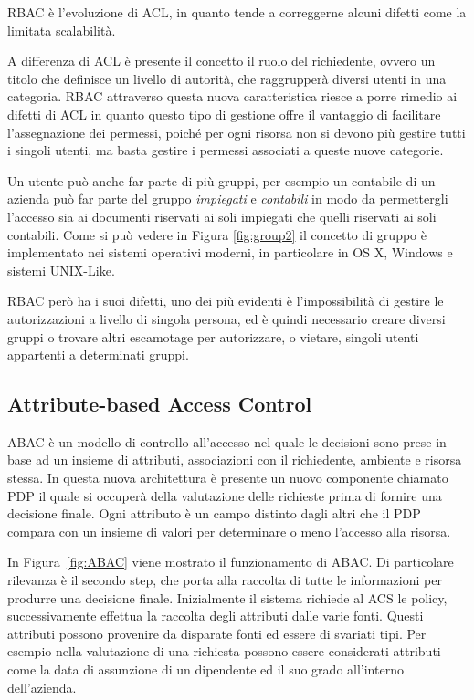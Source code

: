 \ac{RBAC} è l'evoluzione di \ac{ACL}, in quanto tende a correggerne alcuni difetti come la limitata scalabilità. \par
A differenza di \ac{ACL} è presente il concetto il ruolo del richiedente, ovvero un titolo che definisce un livello di autorità, che raggrupperà diversi utenti in una categoria. 
\ac{RBAC} attraverso questa nuova caratteristica riesce a porre rimedio ai difetti di \ac{ACL} in quanto
questo tipo di gestione offre il vantaggio di facilitare l'assegnazione dei permessi, poiché per ogni risorsa non si devono più gestire tutti i singoli utenti, ma basta gestire i permessi associati a queste nuove categorie. 


Un utente può anche far parte di più gruppi, per esempio un contabile di un azienda può far parte del gruppo \textit{impiegati} e \textit{contabili} in modo da permettergli l'accesso sia ai documenti riservati ai soli impiegati che quelli riservati ai soli contabili.
Come si può vedere in Figura \ref{fig:group2} il concetto di gruppo è implementato nei sistemi operativi moderni, in particolare in OS X, Windows e sistemi UNIX-Like.

\ac{RBAC} però ha i suoi difetti, uno dei più evidenti è l'impossibilità di gestire le autorizzazioni a livello di singola persona, ed è quindi necessario creare diversi gruppi o trovare altri escamotage per autorizzare, o vietare, singoli utenti appartenti a determinati gruppi.


\subsection*{Attribute-based Access Control } %
\label{sub:attribute_based_access_control_}

\ac{ABAC} è un modello di controllo all'accesso  nel quale le decisioni sono prese in base ad un insieme 
di attributi, associazioni con il richiedente, ambiente e risorsa stessa.
In questa nuova architettura è presente un nuovo componente chiamato \ac{PDP} il quale si occuperà della valutazione delle richieste prima di fornire una decisione finale.
Ogni attributo è un campo distinto dagli altri che il \ac{PDP} compara con un insieme di valori per determinare o meno l'accesso alla risorsa. 

In Figura~\ref{fig:ABAC} viene mostrato il funzionamento di \ac{ABAC}. Di particolare rilevanza è il secondo step, che porta alla raccolta di tutte le informazioni per produrre una decisione finale.
Inizialmente il sistema richiede al \ac{ACS} le policy, successivamente effettua la raccolta degli attributi dalle varie fonti.
Questi attributi possono provenire da disparate fonti ed essere di svariati tipi. Per esempio nella valutazione di una richiesta possono essere considerati attributi come la data di assunzione di un dipendente ed il suo grado all'interno dell'azienda. 


